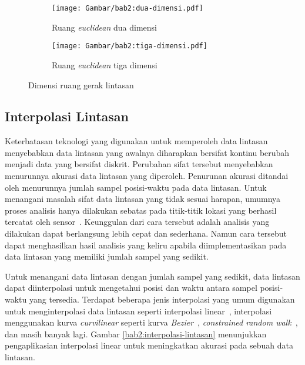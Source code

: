 \iffalse

Pada skripsi ini, entitas yang diamati akan bergerak dalam ruang \textit{euclidean} dua dimensi yang disimbolkan sebagai $\mathbb{R}^2$\lionov{ini harusnya ada di batasan}.

\fi

\begin{figure}[b!]
    \centering
    \begin{subfigure}[h]{0.325\textwidth}
        \centering
        \texttt{[image: Gambar/bab2:dua-dimensi.pdf]}
        \caption{Ruang \textit{euclidean} dua dimensi}
        \label{bab2:dua-dimensi}
    \end{subfigure} \hspace{1.25cm}
    \begin{subfigure}[h]{0.325\textwidth}
        \centering
        \texttt{[image: Gambar/bab2:tiga-dimensi.pdf]}
        \caption{Ruang \textit{euclidean} tiga dimensi}
        \label{bab2:tiga-dimensi}
    \end{subfigure}
    \caption{Dimensi ruang gerak lintasan}
    \label{bab2:ruang-gerak}
\end{figure}

\subsection{Interpolasi Lintasan}
\label{subsec:interpolasi}

Keterbatasan teknologi yang digunakan untuk memperoleh data lintasan menyebabkan data lintasan yang awalnya diharapkan bersifat kontinu berubah menjadi data yang bersifat diskrit. Perubahan sifat tersebut menyebabkan menurunnya akurasi data lintasan yang diperoleh. Penurunan akurasi ditandai oleh menurunnya jumlah sampel posisi-waktu pada data lintasan. Untuk menangani masalah sifat data lintasan yang tidak sesuai harapan, umumnya proses analisis hanya dilakukan sebatas pada titik-titik lokasi yang berhasil tercatat oleh sensor~\cite{wiratma:trajectory}. Keunggulan dari cara tersebut adalah analisis yang dilakukan dapat berlangsung lebih cepat dan sederhana. Namun cara tersebut dapat menghasilkan hasil analisis yang keliru apabila diimplementasikan pada data lintasan yang memiliki jumlah sampel yang sedikit.

Untuk menangani data lintasan dengan jumlah sampel yang sedikit, data lintasan dapat diinterpolasi untuk mengetahui posisi dan waktu antara sampel posisi-waktu yang tersedia. Terdapat beberapa jenis interpolasi yang umum digunakan untuk menginterpolasi data lintasan seperti interpolasi linear~\cite{wiratma:trajectory}, interpolasi menggunakan kurva \textit{curvilinear} seperti kurva \textit{Bezier}~\cite{tremblay:02:curvilinear}, \textit{constrained random walk}~\cite{wentz:02:constrained-random-walk}, dan masih banyak lagi. Gambar \ref{bab2:interpolasi-lintasan} menunjukkan pengaplikasian interpolasi linear untuk meningkatkan akurasi pada sebuah data lintasan.

